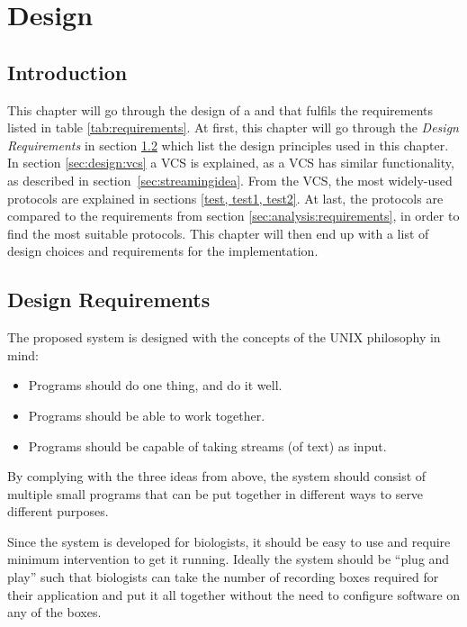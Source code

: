 \chapter{Design} \label{chp:design}

\section{Introduction}
This chapter will go through the design of a  and  that fulfils the requirements listed in table \ref{tab:requirements}.
At first, this chapter will go through the \textit{Design Requirements} in section \ref{sec:design:requirements} which list the design principles used in this chapter.
In section \ref{sec:design:vcs} a \ac{VCS} is explained, as a \ac{VCS} has similar functionality, as described in section~\ref{sec:streamingidea}.
From the \ac{VCS}, the most widely-used protocols are explained in sections \cref{test, test1, test2}.
At last, the protocols are compared to the requirements from section \ref{sec:analysis:requirements}, in order to find the most suitable protocols.
This chapter will then end up with a list of design choices and requirements for the implementation.

\section{Design Requirements} \label{sec:design:requirements}
The proposed system is designed with the concepts of the UNIX philosophy in mind:
\begin{itemize}
	\item Programs should do one thing, and do it well.
	\item Programs should be able to work together.
	\item Programs should be capable of taking streams (of text) as input.
\end{itemize}


By complying with the three ideas from above, the system should consist of multiple small programs that can be put together in different ways to serve different purposes.

Since the system is developed for biologists, it should be easy to use and require minimum intervention to get it running. Ideally the system should be “plug and play” such that biologists can take the number of recording boxes required for their application and put it all together without the need to configure software on any of the boxes. 

